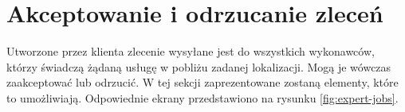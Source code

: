 \section{Akceptowanie i odrzucanie zleceń}

Utworzone przez klienta zlecenie wysyłane jest do wszystkich wykonawców, którzy świadczą żądaną usługę w pobliżu zadanej lokalizacji. Mogą je wówczas zaakceptować lub odrzucić. W tej sekcji zaprezentowane zostaną elementy, które to umożliwiają. Odpowiednie ekrany przedstawiono na rysunku \ref{fig:expert-jobs}.

\begin{figure}[ht]
  \captionsetup[subfigure]{justification=centering}
  \centering
  \begin{subfigure}[t]{0.32\textwidth}
    \centering

\end{subfigure}
\end{figure}
